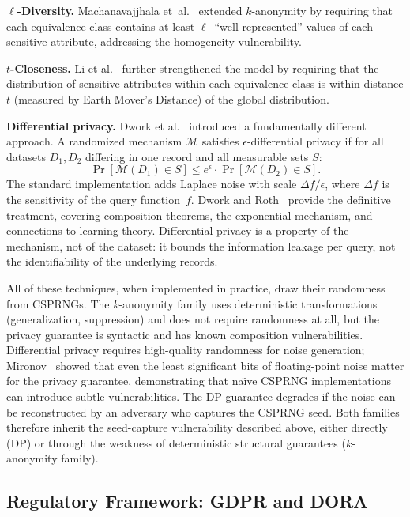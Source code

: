 \documentclass[journal]{IEEEtran}
\begin{document}
\textbf{$\ell$-Diversity.} Machanavajjhala et~al.~\cite{machanavajjhala2007ldiv} extended $k$-anonymity by requiring that each equivalence class contains at least $\ell$~``well-represented'' values of each sensitive attribute, addressing the homogeneity vulnerability.

\textbf{$t$-Closeness.} Li et al.~\cite{li2007tcloseness} further strengthened the model by requiring that the distribution of sensitive attributes within each equivalence class is within distance $t$ (measured by Earth Mover's Distance) of the global distribution.

\textbf{Differential privacy.} Dwork et al.~\cite{dwork2006dp} introduced a fundamentally different approach. A randomized mechanism $\mathcal{M}$ satisfies $\epsilon$-differential privacy if for all datasets $D_1, D_2$ differing in one record and all measurable sets $S$:
\begin{equation}
\Pr[\mathcal{M}(D_1) \in S] \leq e^\epsilon \cdot \Pr[\mathcal{M}(D_2) \in S].
\label{eq:dp}
\end{equation}
The standard implementation adds Laplace noise with scale $\Delta f / \epsilon$, where $\Delta f$ is the sensitivity of the query function~$f$. Dwork and Roth~\cite{dwork2014algfound} provide the definitive treatment, covering composition theorems, the exponential mechanism, and connections to learning theory. Differential privacy is a property of the mechanism, not of the dataset: it bounds the information leakage per query, not the identifiability of the underlying records.

All of these techniques, when implemented in practice, draw their randomness from CSPRNGs. The $k$-anonymity family uses deterministic transformations (generalization, suppression) and does not require randomness at all, but the privacy guarantee is syntactic and has known composition vulnerabilities. Differential privacy requires high-quality randomness for noise generation; Mironov~\cite{mironov2012significance} showed that even the least significant bits of floating-point noise matter for the privacy guarantee, demonstrating that na\"{\i}ve CSPRNG implementations can introduce subtle vulnerabilities. The DP guarantee degrades if the noise can be reconstructed by an adversary who captures the CSPRNG seed. Both families therefore inherit the seed-capture vulnerability described above, either directly (DP) or through the weakness of deterministic structural guarantees ($k$-anonymity family).

\subsection{Regulatory Framework: GDPR and DORA}
\label{subsec:gdpr}
\end{document}
